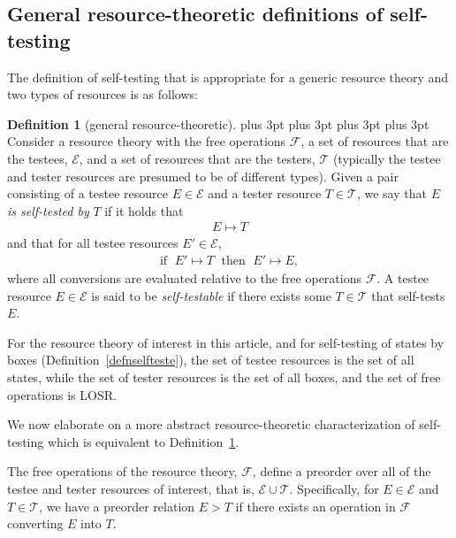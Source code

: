 \documentclass[prx,11pt,letterpaper,twocolumn,accepted=2023-11-27]{quantumarticle}
\theoremstyle{plain}
\theoremstyle{definition}
\newtheorem{defn}{Definition}
\begin{document}
\begin{appendices}
\section{General resource-theoretic definitions of self-testing} \label{equivdefnself}


The definition of self-testing that is appropriate for a generic resource theory and two types of resources is as follows:
\begin{defn}[general resource-theoretic]\label{defnselftesteGeneral}
{
\abovedisplayskip=1pt plus 3pt
\belowdisplayskip=1pt plus 3pt
\abovedisplayshortskip=1pt plus 3pt
\belowdisplayshortskip=1pt plus 3pt
Consider a resource theory with the free operations $\mathcal{F}$, a set of resources that are the testees, $\mathcal{E}$,
 and a set of resources that are the testers, $\mathcal{T}$
  (typically the testee and tester resources are presumed to be of different types).  Given a pair consisting of a testee resource $E \in \mathcal{E}$ and a tester resource $T \in\mathcal{T}$, we say that $E$  {\em is self-tested by} $T$ 
   if it holds that
\begin{align}
E \mapsto T \nonumber
\end{align}
 and that for all testee resources $E' \in \mathcal{E}$,
\begin{align} 
\textrm{if }\; E' \mapsto T \; \textrm{ then }\; E' \mapsto E,\nonumber
\end{align}
where all conversions are evaluated relative to the free operations $\mathcal{F}$. A testee resource $E \in \mathcal{E}$ is said to be {\em self-testable} 
 if there exists some $T \in \mathcal{T}$ that self-tests $E$.
}
\end{defn}

For the resource theory of interest in this article, and for self-testing of states by boxes (Definition~\ref{defnselfteste}), the set of testee resources is the set of all states, while
the set of tester resources is the set of all boxes,
 and the set of free operations is LOSR.

We now elaborate on a more abstract resource-theoretic characterization of self-testing which is equivalent to Definition~\ref{defnselftesteGeneral}.

The free operations of the resource theory, $\mathcal{F}$, define a preorder over all of the testee and tester resources of interest, that is,  $\mathcal{E}\cup \mathcal{T}$.   Specifically, for $E\in \mathcal{E}$ and $T \in \mathcal{T}$, we have a preorder relation $E > T$ if there exists an operation in $\mathcal{F}$ converting $E$ into $T$. 


\end{appendices}
\end{document}
